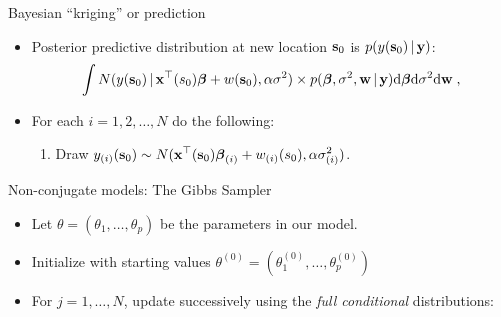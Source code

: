 \begin{frame}{Bayesian ``kriging'' or prediction}
 
 \begin{itemize}\setlength{\itemsep}{0.4cm}
  \item Posterior predictive distribution at new location $\textbf{s}_0$ is $p(y(\textbf{s}_0)\,|\, \textbf{y})$:
  \[
   \int N(y(\textbf{s}_0)\,|\, \textbf{x}^{\top}(s_0)\mbox{\boldmath $ \beta $} + w(\textbf{s}_0), \alpha \sigma^2)\times p(\mbox{\boldmath $ \beta $}, \sigma^2, \textbf{w} \,|\, \textbf{y})\mbox{d}\mbox{\boldmath $ \beta $} \mbox{d}\sigma^2\mbox{d}\textbf{w}\;,
  \]
  \item For each $i=1,2,\ldots,N$ do the following: 
 \begin{enumerate}\setlength{\itemsep}{0.25cm}
  \item Draw $\displaystyle y_{(i)}(\textbf{s}_0) \sim N(\textbf{x}^{\top}(\textbf{s}_0)\mbox{\boldmath $ \beta $}_{(i)} + w_{(i)}(s_0), \alpha\sigma^2_{(i)})$.
 \end{enumerate}
 \end{itemize}
 
\end{frame}


\begin{frame}{Non-conjugate models: The Gibbs Sampler}

{\small

\begin{itemize}\setlength{\itemsep}{0.4cm} 
\item Let $\theta=(\theta_1,\ldots,\theta_p)$ be the parameters in our model.

\item Initialize with starting values $\theta^{(0)}=(\theta_{1}^{(0)},\ldots,\theta_{p}^{(0)})$ 

\item For $j=1,\ldots,N$, update successively using the \emph{full conditional} distributions:
\end{itemize}
}
\end{frame}


